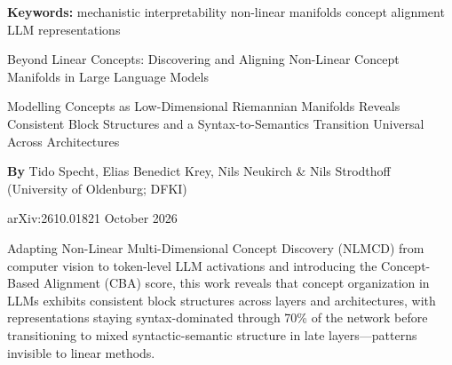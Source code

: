 \documentclass[10pt,twocolumn]{article}
\begin{document}
\setlength{\parindent}{0pt}
\setlength{\parskip}{4pt}

{\small\color{keywordgray}\textbf{Keywords:}
  mechanistic interpretability \textbullet{}
  non-linear manifolds \textbullet{}
  concept alignment \textbullet{}
  LLM representations}\par\vspace{4pt}

{\LARGE\bfseries\raggedright
  Beyond Linear Concepts: Discovering and Aligning Non-Linear Concept Manifolds
  in Large Language Models}\par\vspace{4pt}

{\large\itshape\raggedright
  Modelling Concepts as Low-Dimensional Riemannian Manifolds Reveals
  Consistent Block Structures and a Syntax-to-Semantics Transition
  Universal Across Architectures}\par\vspace{6pt}

{\small\textbf{By} Tido Specht, Elias Benedict Krey, Nils Neukirch
  \& Nils Strodthoff (University of Oldenburg; DFKI)}\par\vspace{2pt}

{\small\color{keywordgray}arXiv:2610.01821 \textbullet{} October 2026}
\par\vspace{2pt}\noindent{\color{rulered}\rule{\columnwidth}{0.6pt}}\vspace{6pt}

Adapting Non-Linear Multi-Dimensional Concept Discovery (NLMCD) from computer vision
to token-level LLM activations and introducing the Concept-Based Alignment (CBA)
score, this work reveals that concept organization in LLMs exhibits consistent
block structures across layers and architectures, with representations staying
syntax-dominated through 70\% of the network before transitioning to mixed
syntactic-semantic structure in late layers---patterns invisible to linear methods.
\end{document}
